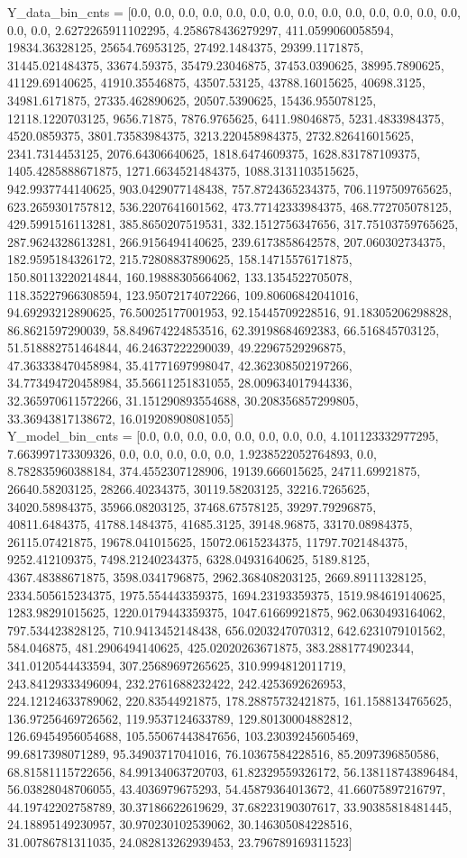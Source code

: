 \documentclass[12pt]{article}
\begin{document}
	Y\_data\_bin\_cnts = [0.0, 0.0, 0.0, 0.0, 0.0, 0.0, 0.0, 0.0, 0.0, 0.0, 0.0, 0.0, 0.0, 0.0, 0.0, 0.0, 2.6272265911102295, 4.258678436279297, 411.0599060058594, 19834.36328125, 25654.76953125, 27492.1484375, 29399.1171875, 31445.021484375, 33674.59375, 35479.23046875, 37453.0390625, 38995.7890625, 41129.69140625, 41910.35546875, 43507.53125, 43788.16015625, 40698.3125, 34981.6171875, 27335.462890625, 20507.5390625, 15436.955078125, 12118.1220703125, 9656.71875, 7876.9765625, 6411.98046875, 5231.4833984375, 4520.0859375, 3801.73583984375, 3213.220458984375, 2732.826416015625, 2341.7314453125, 2076.64306640625, 1818.6474609375, 1628.831787109375, 1405.4285888671875, 1271.6634521484375, 1088.3131103515625, 942.9937744140625, 903.0429077148438, 757.8724365234375, 706.1197509765625, 623.2659301757812, 536.2207641601562, 473.77142333984375, 468.772705078125, 429.5991516113281, 385.8650207519531, 332.1512756347656, 317.75103759765625, 287.9624328613281, 266.9156494140625, 239.6173858642578, 207.060302734375, 182.9595184326172, 215.72808837890625, 158.14715576171875, 150.80113220214844, 160.19888305664062, 133.1354522705078, 118.35227966308594, 123.95072174072266, 109.80606842041016, 94.69293212890625, 76.50025177001953, 92.15445709228516, 91.18305206298828, 86.8621597290039, 58.849674224853516, 62.39198684692383, 66.516845703125, 51.518882751464844, 46.24637222290039, 49.22967529296875, 47.363338470458984, 35.41771697998047, 42.362308502197266, 34.773494720458984, 35.56611251831055, 28.009634017944336, 32.365970611572266, 31.151290893554688, 30.208356857299805, 33.36943817138672, 16.019208908081055]\\
	Y\_model\_bin\_cnts = [0.0, 0.0, 0.0, 0.0, 0.0, 0.0, 0.0, 0.0, 4.101123332977295, 7.663997173309326, 0.0, 0.0, 0.0, 0.0, 0.0, 1.9238522052764893, 0.0, 8.782835960388184, 374.4552307128906, 19139.666015625, 24711.69921875, 26640.58203125, 28266.40234375, 30119.58203125, 32216.7265625, 34020.58984375, 35966.08203125, 37468.67578125, 39297.79296875, 40811.6484375, 41788.1484375, 41685.3125, 39148.96875, 33170.08984375, 26115.07421875, 19678.041015625, 15072.0615234375, 11797.7021484375, 9252.412109375, 7498.21240234375, 6328.04931640625, 5189.8125, 4367.48388671875, 3598.0341796875, 2962.368408203125, 2669.89111328125, 2334.505615234375, 1975.554443359375, 1694.23193359375, 1519.984619140625, 1283.98291015625, 1220.0179443359375, 1047.61669921875, 962.0630493164062, 797.534423828125, 710.9413452148438, 656.0203247070312, 642.6231079101562, 584.046875, 481.2906494140625, 425.02020263671875, 383.2881774902344, 341.0120544433594, 307.25689697265625, 310.9994812011719, 243.84129333496094, 232.2761688232422, 242.4253692626953, 224.12124633789062, 220.83544921875, 178.28875732421875, 161.1588134765625, 136.97256469726562, 119.9537124633789, 129.80130004882812, 126.69454956054688, 105.55067443847656, 103.23039245605469, 99.6817398071289, 95.34903717041016, 76.10367584228516, 85.2097396850586, 68.81581115722656, 84.99134063720703, 61.82329559326172, 56.138118743896484, 56.03828048706055, 43.4036979675293, 54.45879364013672, 41.66075897216797, 44.19742202758789, 30.37186622619629, 37.68223190307617, 33.90385818481445, 24.18895149230957, 30.970230102539062, 30.146305084228516, 31.00786781311035, 24.082813262939453, 23.796789169311523]\\
\end{document}
